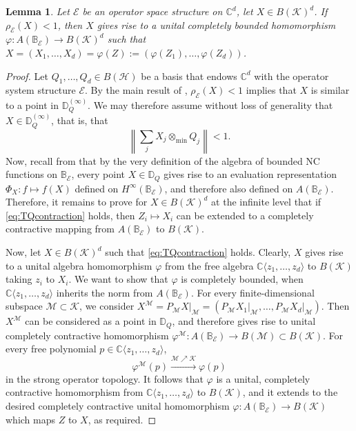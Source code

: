 \documentclass[12pt]{amsart}
\numberwithin{equation}{section}
\newtheorem{lemma}[theorem]{Lemma}
\theoremstyle{definition}
\newcommand{\cE}{\mathcal{E}}
\newcommand{\cH}{\mathcal{H}}
\newcommand{\cK}{\mathcal{K}}
\newcommand{\cM}{\mathcal{M}}
\newcommand{\bB}{\mathbb{B}}
\newcommand{\bC}{\mathbb{C}}
\newcommand{\C}{\mathbb{C}}
\newcommand{\bD}{\mathbb{D}}
\begin{document}
\begin{lemma}\label{lem:specrad_strict}
        Let $\cE$ be an operator space structure on $\C^d$, let $X \in B(\cK)^d$. If $\rho_\cE(X) < 1$, then $X$ gives rise to a unital completely bounded homomorphism $\varphi \colon A(\bB_\cE) \to B(\cK)^d$ such that $X = (X_1, \ldots, X_d) = \varphi(Z) := (\varphi(Z_1), \ldots, \varphi(Z_d))$. 
\end{lemma}
\begin{proof}
    Let $Q_1, \ldots, Q_d \in B(\cH)$ be a basis that endows $\C^d$ with the operator system structure $\cE$. By the main result of \cite[Theorem 2.7]{shalsham2025spectral}, $\rho_\cE(X) < 1$ implies that $X$ is similar to a point in $\bD_Q^{(\infty)}$. 
    We may therefore assume without loss of generality that $X \in \bD_Q^{(\infty)}$, that is, that 
    \begin{equation}\label{eq:TQcontraction}
    \left\| \sum_j X_j \otimes_{\min} Q_j \right\| < 1.
    \end{equation}
    Now, recall from \cite{SampatShalit25,sampat2025weak} that by the very definition of the algebra of bounded NC functions on $\bB_\cE$, every point $X \in \bD_Q$ gives rise to an evaluation representation $\Phi_X \colon f \mapsto f(X)$ defined on $H^\infty(\bB_\cE)$, and therefore also defined on $A(\bB_\cE)$. Therefore, it remains to prove for $X \in B(\cK)^d$ at the infinite level that if \eqref{eq:TQcontraction} holds, then $Z_i \mapsto X_i$ can be extended to a completely contractive mapping from $A(\bB_\cE)$ to $B(\cK)$. 

    Now, let $X \in B(\cK)^d$ such that \eqref{eq:TQcontraction} holds. Clearly, $X$ gives rise to a unital algebra homomorphism $\varphi$ from the free algebra $\bC\langle z_1, \ldots, z_d \rangle$ to $B(\cK)$ taking $z_i$ to $X_i$. 
    We want to show that $\varphi$ is completely bounded, when $\bC \langle z_1, \ldots, z_d \rangle$ inherits the norm from $A(\bB_\cE)$. 
    For every finite-dimensional subspace $\cM \subset \cK$, we consider $X^\cM = P_\cM X \big|_\cM = (P_\cM X_1 \big|_\cM, \ldots, P_\cM X_d \big|_\cM)$. 
    Then $X^\cM$ can be considered as a point in $\bD_Q$, and therefore gives rise to unital completely contractive homomorphism $\varphi^\cM \colon A(\bB_\cE) \to B(\cM) \subset B(\cK)$. For every free polynomial $p \in \bC \langle z_1, \ldots, z_d \rangle$, 
    \[
    \varphi^\cM(p) \xrightarrow{\cM \nearrow \cK} \varphi(p) 
    \]
    in the strong operator topology. 
    It follows that $\varphi$ is a unital, completely contractive homomorphism from $\bC\langle z_1, \ldots, z_d \rangle$ to $B(\cK)$, and it extends to the desired completely contractive unital homomorphism $\varphi \colon A(\bB_\cE) \to B(\cK)$ which maps $Z$ to $X$, as required. 
\end{proof}
\end{document}
